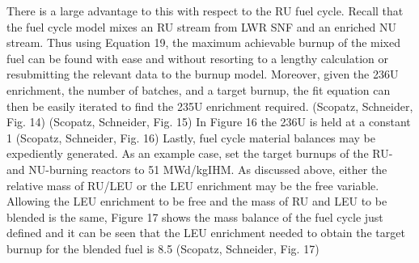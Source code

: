There is a large advantage to this with respect to the RU fuel cycle.  Recall that the fuel cycle model mixes an RU stream from LWR SNF and an enriched NU stream.  Thus using Equation 19, the maximum achievable burnup of the mixed fuel can be found with ease and without resorting to a lengthy calculation or resubmitting the relevant data to the burnup model.  Moreover, given the 236U enrichment, the number of batches, and a target burnup, the fit equation can then be easily iterated to find the 235U enrichment required.  
(Scopatz, Schneider, Fig. 14)
(Scopatz, Schneider, Fig. 15)
In Figure 16 the 236U is held at a constant 1%
(Scopatz, Schneider, Fig. 16)
Lastly, fuel cycle material balances may be expediently generated.   As an example case, set the target burnups of the RU- and NU-burning reactors to 51 MWd/kgIHM.  As discussed above, either the relative mass of RU/LEU or the LEU enrichment may be the free variable.  Allowing the LEU enrichment to be free and the mass of RU and LEU to be blended is the same,  Figure 17 shows the mass balance of the fuel cycle just defined and it can be seen that the LEU enrichment needed to obtain the target burnup for the blended fuel is 8.5%
(Scopatz, Schneider, Fig. 17)



